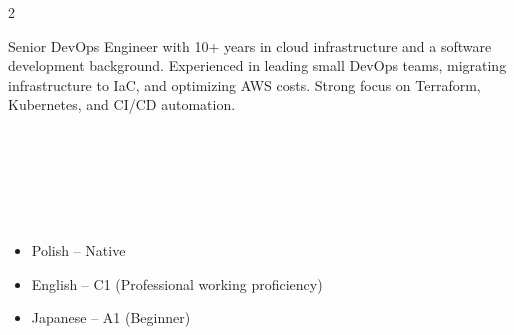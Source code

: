 \documentclass[10pt,a4paper,ragged2e,withhyper]{altacv}
\begin{document}
\begin{paracol}{2}

\switchcolumn

Senior DevOps Engineer with 10+ years in cloud infrastructure and a software development background. Experienced in leading small DevOps teams, migrating infrastructure to IaC, and optimizing AWS costs. Strong focus on Terraform, Kubernetes, and CI/CD automation.


\\
\\
\\
\\
\\

\begin{itemize}
\item Polish -- Native
\item English -- C1 (Professional working proficiency)
\item Japanese -- A1 (Beginner)
\end{itemize}


\end{paracol}
\end{document}
